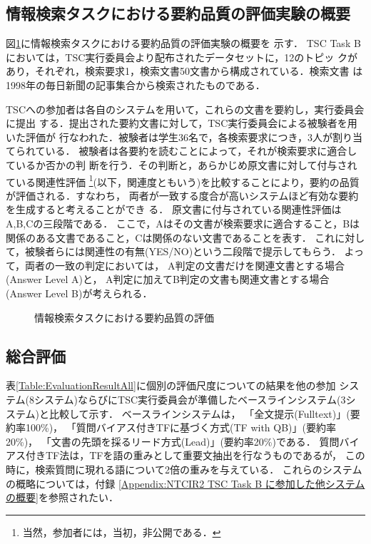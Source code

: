 \subsection{情報検索タスクにおける要約品質の評価実験の概要}

図\ref{Fig:SummaryInIR}に情報検索タスクにおける要約品質の評価実験の概要を
示す．
TSC Task Bにおいては，TSC実行委員会より配布されたデータセットに，12のトピッ
クがあり，それぞれ，検索要求1，検索文書50文書から構成されている．検索文書
は1998年の毎日新聞の記事集合から検索されたものである．

TSCへの参加者は各自のシステムを用いて，これらの文書を要約し，実行委員会に提出
する．提出された要約文書に対して，TSC実行委員会による被験者を用いた評価が
行なわれた．被験者は学生36名で，各検索要求につき，3人が割り当てられている．
被験者は各要約を読むことによって，それが検索要求に適合しているか否かの判
断を行う．その判断と，あらかじめ原文書に対して付与されている関連性評価
\footnote{当然，参加者には，当初，非公開である．}(以下，関連度ともいう)を比較することにより，要約の品質が評価される．すなわち，
両者が一致する度合が高いシステムほど有効な要約を生成すると考えることができ
る．
原文書に付与されている関連性評価はA,B,Cの三段階である．
ここで，Aはその文書が検索要求に適合すること，Bは関係のある文書であること，Cは関係のない文書であることを表す．
これに対して，被験者らには関連性の有無(YES/NO)という二段階で提示してもらう．
よって，両者の一致の判定においては，
A判定の文書だけを関連文書とする場合(Answer Level A)と，
A判定に加えてB判定の文書も関連文書とする場合(Answer Level B)が考えられる．
\begin{figure}[htbp]
\begin{center}
\end{center}
\caption{情報検索タスクにおける要約品質の評価}\label{Fig:SummaryInIR}
\end{figure}

\subsection{総合評価}

表\ref{Table:EvaluationResultAll}に個別の評価尺度についての結果を他の参加
システム(8システム)ならびにTSC実行委員会が準備したベースラインシステム(3システム)と比較して示す．
ベースラインシステムは，
「全文提示(Fulltext)」(要約率100\%)，
「質問バイアス付きTFに基づく方式(TF with QB)」(要約率20\%)，
「文書の先頭を採るリード方式(Lead)」(要約率20\%)である．
質問バイアス付きTF法は，TFを語の重みとして重要文抽出を行なうものであるが，
この時に，検索質問に現れる語について2倍の重みを与えている．
これらのシステムの概略については，付録
\ref{Appendix:NTCIR2 TSC Task B に参加した他システムの概要}を参照されたい．

